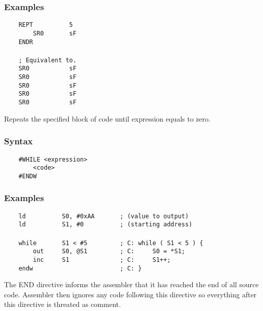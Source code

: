     \subsubsection{Examples}
        \verb'    REPT          5'\\
        \verb'        SR0       sF'\\
        \verb'    ENDR'\\
        \verb''\\
        \verb'    ; Equivalent to.'\\
        \verb'    SR0           sF'\\
        \verb'    SR0           sF'\\
        \verb'    SR0           sF'\\
        \verb'    SR0           sF'\\
        \verb'    SR0           sF'

    Repeats the specified block of code until expression equals to zero.

    \subsubsection{Syntax}
        \verb'    #WHILE <expression>'\\
        \verb'        <code>'\\
        \verb'    #ENDW'

    \subsubsection{Examples}
        \verb'    ld          S0, #0xAA       ; (value to output)'\\
        \verb'    ld          S1, #0          ; (starting address)'\\
        \verb''\\
        \verb'    while       S1 < #5         ; C: while ( S1 < 5 ) {'\\
        \verb'        out     S0, @S1         ; C:     S0 = *S1;'\\
        \verb'        inc     S1              ; C:     S1++;'\\
        \verb'    endw                        ; C: }'

    The END directive informs the assembler that it has reached the end of all source code. Assembler then ignores any code following this directive so everything after this directive is threated as comment.

